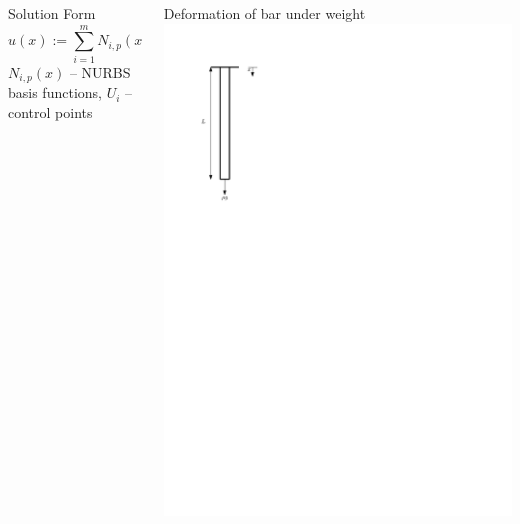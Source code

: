 \documentclass{beamer}
\newcommand{\pd}[2]{\frac{\partial #1}{\partial #2}}
\begin{document}
\begin{frame}[allowframebreaks]
\begin{columns}
\begin{column}[b]{0.78\linewidth}
  \begin{block}{Solution Form}
    \begin{equation}\nonumber
      u(x) := \sum_{i=1}^{m} N_{i,p}(x) U_i, \quad \pd{u(x)}{x} := \sum_{i=1}^{m} \pd{N_{i,p}(x)}{x}  U_i
    \end{equation}
    $N_{i,p}(x)$ --  NURBS basis functions, $U_i$ -- control points
  \end{block}
  \end{column}
  \begin{column}[b]{0.2\linewidth}
    Deformation of bar  under weight
    \includegraphics[width=\textwidth]{figures/bar-setup.pdf} 
  \end{column}
  \end{columns}

  \newpage


\end{frame}
\end{document}
